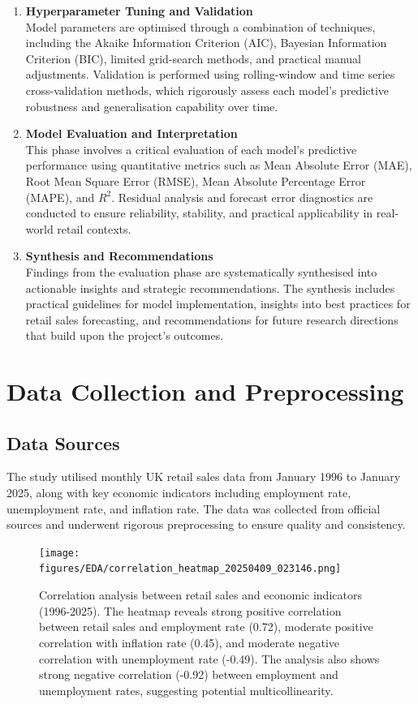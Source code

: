 \documentclass[12pt,a4paper]{report}
\begin{document}
\begin{enumerate}
    \item \textbf{Hyperparameter Tuning and Validation}\\
    Model parameters are optimised through a combination of techniques, including the Akaike Information Criterion (AIC), Bayesian Information Criterion (BIC), limited grid-search methods, and practical manual adjustments. Validation is performed using rolling-window and time series cross-validation methods, which rigorously assess each model's predictive robustness and generalisation capability over time.
    
    \item \textbf{Model Evaluation and Interpretation}\\
    This phase involves a critical evaluation of each model's predictive performance using quantitative metrics such as Mean Absolute Error (MAE), Root Mean Square Error (RMSE), Mean Absolute Percentage Error (MAPE), and $R^2$. Residual analysis and forecast error diagnostics are conducted to ensure reliability, stability, and practical applicability in real-world retail contexts.
    
    \item \textbf{Synthesis and Recommendations}\\
    Findings from the evaluation phase are systematically synthesised into actionable insights and strategic recommendations. The synthesis includes practical guidelines for model implementation, insights into best practices for retail sales forecasting, and recommendations for future research directions that build upon the project's outcomes.
\end{enumerate}

\section{Data Collection and Preprocessing}
\subsection{Data Sources}
The study utilised monthly UK retail sales data from January 1996 to January 2025, along with key economic indicators including employment rate, unemployment rate, and inflation rate. The data was collected from official sources and underwent rigorous preprocessing to ensure quality and consistency.

\begin{figure}[htbp]
\centering
\texttt{[image: figures/EDA/correlation\_heatmap\_20250409\_023146.png]}
\caption{Correlation analysis between retail sales and economic indicators (1996-2025). The heatmap reveals strong positive correlation between retail sales and employment rate (0.72), moderate positive correlation with inflation rate (0.45), and moderate negative correlation with unemployment rate (-0.49). The analysis also shows strong negative correlation (-0.92) between employment and unemployment rates, suggesting potential multicollinearity.}
\label{fig:correlation_heatmap}
\end{figure}
\end{document}
